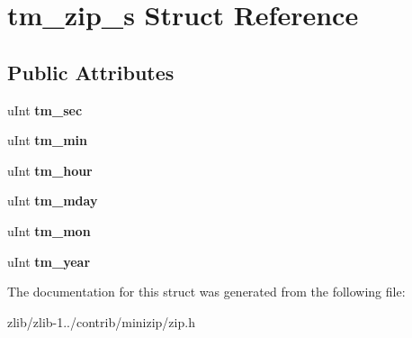 \hypertarget{structtm__zip__s}{\section{tm\+\_\+zip\+\_\+s Struct Reference}
\label{structtm__zip__s}
}
\subsection*{Public Attributes}
\begin{DoxyCompactItemize}
\item 
\hypertarget{structtm__zip__s_adf073cb37484b209d7f7f0e23275a52d}{u\+Int {\bfseries tm\+\_\+sec}}\label{structtm__zip__s_adf073cb37484b209d7f7f0e23275a52d}

\item 
\hypertarget{structtm__zip__s_ad539676c1522e9f2cb77cb9e65795e2a}{u\+Int {\bfseries tm\+\_\+min}}\label{structtm__zip__s_ad539676c1522e9f2cb77cb9e65795e2a}

\item 
\hypertarget{structtm__zip__s_abfde1cc7378be65b4b23e1488e9bd279}{u\+Int {\bfseries tm\+\_\+hour}}\label{structtm__zip__s_abfde1cc7378be65b4b23e1488e9bd279}

\item 
\hypertarget{structtm__zip__s_aebc461dd0a4a7b7ebd4e00de5fbf594d}{u\+Int {\bfseries tm\+\_\+mday}}\label{structtm__zip__s_aebc461dd0a4a7b7ebd4e00de5fbf594d}

\item 
\hypertarget{structtm__zip__s_ae98d11f7e2b2330b3a83efe97ffef574}{u\+Int {\bfseries tm\+\_\+mon}}\label{structtm__zip__s_ae98d11f7e2b2330b3a83efe97ffef574}

\item 
\hypertarget{structtm__zip__s_ad58d60c6a536a0861dec11c6ef270753}{u\+Int {\bfseries tm\+\_\+year}}\label{structtm__zip__s_ad58d60c6a536a0861dec11c6ef270753}

\end{DoxyCompactItemize}


The documentation for this struct was generated from the following file\+:\begin{DoxyCompactItemize}
\item 
zlib/zlib-\/1../contrib/minizip/zip.\+h\end{DoxyCompactItemize}
